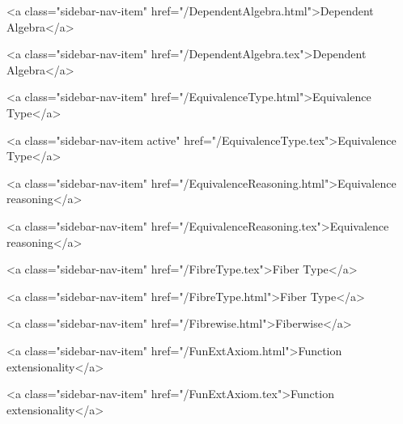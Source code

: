       
    
      
        
          <a class="sidebar-nav-item" href="/DependentAlgebra.html">Dependent Algebra</a>
        
      
    
      
        
          <a class="sidebar-nav-item" href="/DependentAlgebra.tex">Dependent Algebra</a>
        
      
    
      
        
          <a class="sidebar-nav-item" href="/EquivalenceType.html">Equivalence Type</a>
        
      
    
      
        
          <a class="sidebar-nav-item active" href="/EquivalenceType.tex">Equivalence Type</a>
        
      
    
      
        
          <a class="sidebar-nav-item" href="/EquivalenceReasoning.html">Equivalence reasoning</a>
        
      
    
      
        
          <a class="sidebar-nav-item" href="/EquivalenceReasoning.tex">Equivalence reasoning</a>
        
      
    
      
        
          <a class="sidebar-nav-item" href="/FibreType.tex">Fiber Type</a>
        
      
    
      
        
          <a class="sidebar-nav-item" href="/FibreType.html">Fiber Type</a>
        
      
    
      
        
          <a class="sidebar-nav-item" href="/Fibrewise.html">Fiberwise</a>
        
      
    
      
        
          <a class="sidebar-nav-item" href="/FunExtAxiom.html">Function extensionality</a>
        
      
    
      
        
          <a class="sidebar-nav-item" href="/FunExtAxiom.tex">Function extensionality</a>
        
